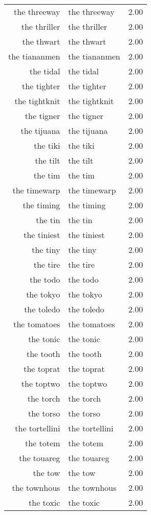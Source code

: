 \begin{table}[ht]
\begin{tabular}{rlr}
  the threeway & the threeway & 2.00 \\ 
  the thriller & the thriller & 2.00 \\ 
  the thwart & the thwart & 2.00 \\ 
  the tiananmen & the tiananmen & 2.00 \\ 
  the tidal & the tidal & 2.00 \\ 
  the tighter & the tighter & 2.00 \\ 
  the tightknit & the tightknit & 2.00 \\ 
  the tigner & the tigner & 2.00 \\ 
  the tijuana & the tijuana & 2.00 \\ 
  the tiki & the tiki & 2.00 \\ 
  the tilt & the tilt & 2.00 \\ 
  the tim & the tim & 2.00 \\ 
  the timewarp & the timewarp & 2.00 \\ 
  the timing & the timing & 2.00 \\ 
  the tin & the tin & 2.00 \\ 
  the tiniest & the tiniest & 2.00 \\ 
  the tiny & the tiny & 2.00 \\ 
  the tire & the tire & 2.00 \\ 
  the todo & the todo & 2.00 \\ 
  the tokyo & the tokyo & 2.00 \\ 
  the toledo & the toledo & 2.00 \\ 
  the tomatoes & the tomatoes & 2.00 \\ 
  the tonic & the tonic & 2.00 \\ 
  the tooth & the tooth & 2.00 \\ 
  the toprat & the toprat & 2.00 \\ 
  the toptwo & the toptwo & 2.00 \\ 
  the torch & the torch & 2.00 \\ 
  the torso & the torso & 2.00 \\ 
  the tortellini & the tortellini & 2.00 \\ 
  the totem & the totem & 2.00 \\ 
  the touareg & the touareg & 2.00 \\ 
  the tow & the tow & 2.00 \\ 
  the townhous & the townhous & 2.00 \\ 
  the toxic & the toxic & 2.00 \\ 

\end{tabular}
\end{table}
